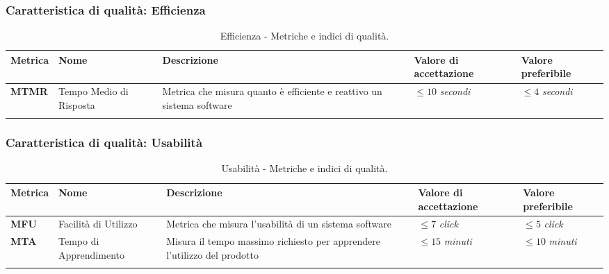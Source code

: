 \subsubsection{Caratteristica di qualità: Efficienza}
\hspace{1pt}
        \begin{longtable}{|C{1.5cm}|L{3cm}|L{4cm}|L{2.5cm}|L{2.5cm}|}
                    \hline
                    \textbf{Metrica} & \textbf{Nome} & \textbf{Descrizione} & \textbf{Valore di accettazione} & \textbf{Valore preferibile} \\
                    \hline
                    \textbf{MTMR} & Tempo Medio di Risposta & Metrica che misura quanto è efficiente e reattivo un sistema software & $\leq 10$ \textit{secondi}  & $\leq 4$ \textit{secondi}\\
                    \hline
                    \caption{Efficienza - Metriche e indici di qualità.}
        \label{tab:metriche_efficienza_testo}
    \end{longtable}

\subsubsection{Caratteristica di qualità: Usabilità}
\hspace{1pt}
            \begin{longtable}{|C{1.5cm}|L{3cm}|L{4cm}|L{2.5cm}|L{2.5cm}|}
                        \hline
                        \textbf{Metrica} & \textbf{Nome} & \textbf{Descrizione} & \textbf{Valore di accettazione} & \textbf{Valore preferibile} \\
                        \hline
                        \textbf{MFU} & Facilità di Utilizzo & Metrica che misura l'usabilità di un sistema software & $\leq 7$ \textit{click}  & $\leq 5$ \textit{click}\\
                        \hline
                        \textbf{MTA} & Tempo di Apprendimento & Misura il tempo massimo richiesto per apprendere l'utilizzo del prodotto & $\leq 15$ \textit{minuti}  & $\leq 10$ \textit{minuti}\\
                        \hline
                        \caption{Usabilità - Metriche e indici di qualità.}
            \label{tab:metriche_usabilità_testo}
        \end{longtable}

